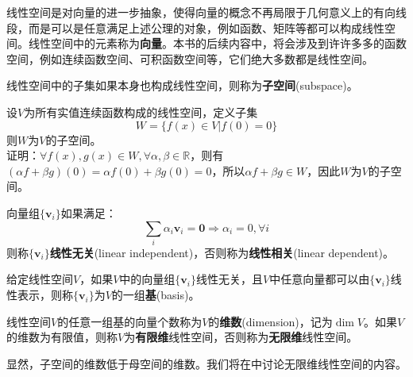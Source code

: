 线性空间是对向量的进一步抽象，使得向量的概念不再局限于几何意义上的有向线段，而是可以是任意满足上述公理的对象，例如函数、矩阵等都可以构成线性空间。线性空间中的元素称为\textbf{向量}。本书的后续内容中，将会涉及到许许多多的函数空间，例如连续函数空间、可积函数空间等，它们绝大多数都是线性空间。

\begin{definition}[子空间]
    线性空间中的子集如果本身也构成线性空间，则称为\textbf{子空间}(subspace)。
\end{definition}

\begin{example}
    设$V$为所有实值连续函数构成的线性空间，定义子集
    $$W=\{f(x)\in V|f(0)=0\}$$
    则$W$为$V$的子空间。\\
    证明：$\forall f(x),g(x)\in W,\forall \alpha,\beta\in \mathbb{R}$，则有$(\alpha f+\beta g)(0)=\alpha f(0)+\beta g(0)=0$，所以$\alpha f+\beta g\in W$，因此$W$为$V$的子空间。
\end{example}

\begin{definition}[线性无关]
    向量组$\{\mathbf{v}_i\}$如果满足：
    $$\sum_i \alpha_i \mathbf{v}_i=\mathbf{0}\Rightarrow \alpha_i=0,\forall i$$
    则称$\{\mathbf{v}_i\}$\textbf{线性无关}(linear independent)，否则称为\textbf{线性相关}(linear dependent)。
\end{definition}

\begin{definition}[基]
    给定线性空间$V$，如果$V$中的向量组$\{\mathbf{v}_i\}$线性无关，且$V$中任意向量都可以由$\{\mathbf{v}_i\}$线性表示，则称$\{\mathbf{v}_i\}$为$V$的一组\textbf{基}(basis)。
\end{definition}


\begin{definition}[维数]
    线性空间$V$的任意一组基的向量个数称为$V$的\textbf{维数}(dimension)，记为$\dim V$。如果$V$的维数为有限值，则称$V$为\textbf{有限维}线性空间，否则称为\textbf{无限维}线性空间。
\end{definition}

显然，子空间的维数低于母空间的维数。我们将在中讨论无限维线性空间的内容。

